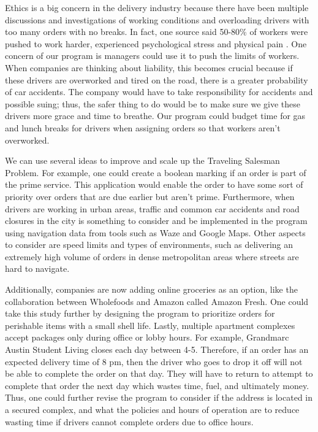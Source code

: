 \documentclass[letterpaper]{article}
\begin{document}
    Ethics is a big concern in the delivery industry because there have been multiple discussions and investigations of working conditions and overloading drivers with too many orders with no breaks. In fact, one source said 50-80\% of workers were pushed to work harder, experienced psychological stress and physical pain \cite{cite:pasternack2019}. One concern of our program is managers could use it to push the limits of workers. When companies are thinking about liability, this becomes crucial because if these drivers are overworked and tired on the road, there is a greater probability of car accidents. The company would have to take responsibility for accidents and possible suing; thus, the safer thing to do would be to make sure we give these drivers more grace and time to breathe. Our program could budget time  for gas and lunch breaks for drivers when assigning orders so that workers aren’t overworked.

    We can use several ideas to improve and scale up the Traveling Salesman Problem. For example, one could create a boolean marking if an order is part of the prime service. This application would enable the order to have some sort of priority over orders that are due earlier but aren’t prime. Furthermore, when drivers are working in urban areas, traffic and common car accidents and road closures in the city is something to consider and be implemented in the program using navigation data from tools such as Waze and Google Maps. Other aspects to consider are speed limits and types of environments, such as delivering an extremely high volume of orders in dense metropolitan areas where streets are hard to navigate. 

    Additionally, companies are now adding online groceries as an option, like the collaboration between Wholefoods and Amazon called Amazon Fresh. One could take this study further by designing the program to prioritize orders for perishable items with a small shell life. Lastly, multiple apartment complexes accept packages only during office or lobby hours. For example, Grandmarc Austin Student Living closes each day between 4-5. Therefore, if an order has an expected delivery time of 8 pm, then the driver who goes to drop it off will not be able to complete the order on that day. They will have to return to attempt to complete that order the next day which wastes time, fuel, and ultimately money. Thus, one could further revise the program to consider if the address is located in a secured complex, and what the policies and hours of operation are to reduce wasting time if drivers cannot complete orders due to office hours. 
\end{document}
